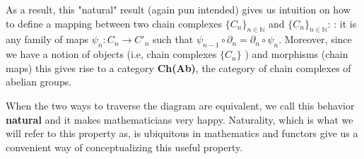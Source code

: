 \begin{example}
        As a result, this "natural" result (again pun intended) 
        gives us intuition on how to define a mapping between two chain complexes
        $\{C_n\}_{n \in \mathbb{N}}$ and $\{C_n\}_{n \in \mathbb{N}}$:
        : it is any family of maps $\psi_n: C_n \to C'_n$ such that 
        $\psi_{n-1} \circ \partial_n = \partial_n \circ \psi_n$. Moreover, 
        since we have a notion 
        of objects (i.e, chain complexes  $\{C_n\}$ ) and morphisms (chain maps) this 
        gives rise to a category \textbf{Ch(Ab)}, the category of chain complexes of abelian groups.

    \end{example}


    

    When the two ways to traverse the diagram are 
    equivalent,
    we call this behavior \textbf{natural} and it makes mathematicians very happy. 
    Naturality, which is what we will refer 
    to this property as, is ubiquitous in mathematics and functors give us a convenient 
    way of conceptualizing this useful property. 

